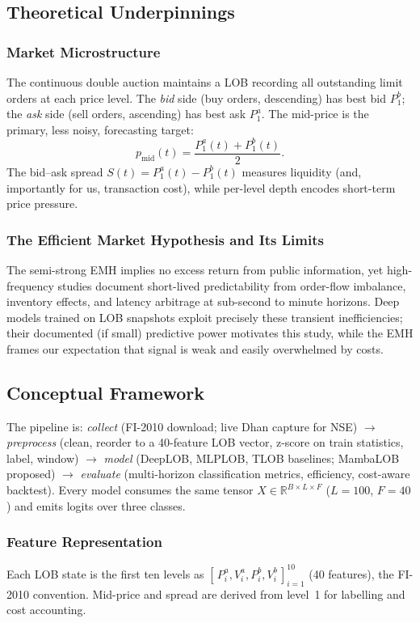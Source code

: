 \documentclass[11pt]{article}
\begin{document}
\subsection{Theoretical Underpinnings}
\subsubsection{Market Microstructure}
The continuous double auction maintains a LOB recording all outstanding limit orders at each price level.
The \emph{bid} side (buy orders, descending) has best bid $P_1^b$; the \emph{ask} side (sell orders,
ascending) has best ask $P_1^a$. The mid-price is the primary, less noisy, forecasting target:
\begin{equation}
p_{\mathrm{mid}}(t) = \frac{P_1^a(t) + P_1^b(t)}{2}.
\end{equation}
The bid--ask spread $S(t) = P_1^a(t) - P_1^b(t)$ measures liquidity (and, importantly for us, transaction
cost), while per-level depth encodes short-term price pressure.

\subsubsection{The Efficient Market Hypothesis and Its Limits}
The semi-strong EMH implies no excess return from public information, yet high-frequency studies document
short-lived predictability from order-flow imbalance, inventory effects, and latency arbitrage at
sub-second to minute horizons. Deep models trained on LOB snapshots exploit precisely these transient
inefficiencies; their documented (if small) predictive power motivates this study, while the EMH frames
our expectation that signal is weak and easily overwhelmed by costs.

\subsection{Conceptual Framework}
The pipeline is: \emph{collect} (FI-2010 download; live Dhan capture for NSE) $\rightarrow$ \emph{preprocess}
(clean, reorder to a 40-feature LOB vector, z-score on train statistics, label, window) $\rightarrow$
\emph{model} (DeepLOB, MLPLOB, TLOB baselines; MambaLOB proposed) $\rightarrow$ \emph{evaluate}
(multi-horizon classification metrics, efficiency, cost-aware backtest). Every model consumes the same
tensor $X \in \mathbb{R}^{B \times L \times F}$ ($L=100$, $F=40$) and emits logits over three classes.

\subsubsection{Feature Representation}
Each LOB state is the first ten levels as
$[\,P^a_i, V^a_i, P^b_i, V^b_i\,]_{i=1}^{10}$ (40 features), the FI-2010 convention. Mid-price and spread
are derived from level~1 for labelling and cost accounting.
\end{document}
